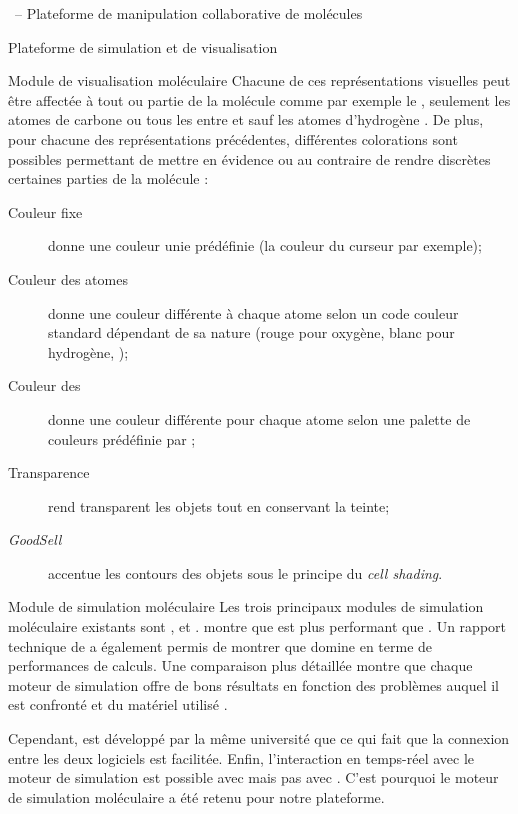\documentclass[myfrancais,ngerman,english,french]{mythesis}
\begin{document}
\begin{mychapter}{\myShaddock\ -- Plateforme de manipulation collaborative de molécules}
\begin{mysection}{Plateforme de simulation et de visualisation}
\begin{mysubsection}{Module de visualisation moléculaire}
				Chacune de ces représentations visuelles peut être affectée à tout ou partie de la molécule comme par exemple \og le   \fg, \og seulement les atomes de carbone \fg ou \og tous les  entre  et  sauf les atomes d'hydrogène \fg.
				De plus, pour chacune des représentations précédentes, différentes colorations sont possibles permettant de mettre en évidence ou au contraire de rendre discrètes certaines parties de la molécule :
				\begin{description}
					\item[Couleur fixe] donne une couleur unie prédéfinie (la couleur du curseur par exemple);
					\item[Couleur des atomes] donne une couleur différente à chaque atome selon un code couleur standard dépendant de sa nature (rouge pour oxygène, blanc pour hydrogène, \myetc);
					\item[Couleur des ] donne une couleur différente pour chaque atome selon une palette de couleurs prédéfinie par ;
					\item[Transparence] rend transparent les objets tout en conservant la teinte;
					\item[\textit{GoodSell}] accentue les contours des objets sous le principe du \textit{cell shading}.
				\end{description}
			\end{mysubsection}
			\begin{mysubsection}{Module de simulation moléculaire}
				Les trois principaux modules de simulation moléculaire existants sont \myGromacs {},   et \myAMBER {}.
				 montre que \myGromacs est plus performant que .
				Un rapport technique de  a également permis de montrer que \myGromacs domine en terme de performances de calculs.
				Une comparaison plus détaillée montre que chaque moteur de simulation offre de bons résultats en fonction des problèmes auquel il est confronté et du matériel utilisé .

				Cependant,  est développé par la même université que  ce qui fait que la connexion entre les deux logiciels est facilitée.
				Enfin, l'interaction en temps-réel avec le moteur de simulation est possible avec  mais pas avec \myGromacs.
				C'est pourquoi le moteur de simulation moléculaire  a été retenu pour notre plateforme.


\end{mysubsection}
\end{mysection}
\end{mychapter}
\end{document}
